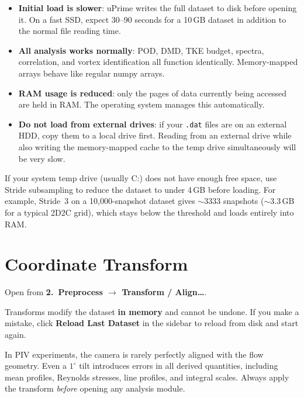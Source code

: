 \documentclass[11pt, a4paper]{report}
\newcommand{\uipth}[1]{\textbf{\textcolor{upblue}{#1}}}
\begin{document}
\begin{itemize}[leftmargin=1.5em]
  \item \textbf{Initial load is slower}: uPrime writes the full dataset to disk before opening it. On a fast SSD, expect 30--90 seconds for a 10\,GB dataset in addition to the normal file reading time.
  \item \textbf{All analysis works normally}: POD, DMD, TKE budget, spectra, correlation, and vortex identification all function identically. Memory-mapped arrays behave like regular numpy arrays.
  \item \textbf{RAM usage is reduced}: only the pages of data currently being accessed are held in RAM. The operating system manages this automatically.
  \item \textbf{Do not load from external drives}: if your \texttt{.dat} files are on an external HDD, copy them to a local drive first. Reading from an external drive while also writing the memory-mapped cache to the temp drive simultaneously will be very slow.
\end{itemize}

\begin{tipbox}
If your system temp drive (usually C:) does not have enough free space, use Stride subsampling to reduce the dataset to under 4\,GB before loading. For example, Stride~3 on a 10,000-snapshot dataset gives $\sim$3333 snapshots ($\sim$3.3\,GB for a typical 2D2C grid), which stays below the threshold and loads entirely into RAM.
\end{tipbox}

\chapter{Coordinate Transform}
\label{ch:transform}

Open from \uipth{2.\ Preprocess $\to$ Transform / Align\ldots}.

\begin{warnbox}
Transforms modify the dataset \textbf{in memory} and cannot be undone. If you make a mistake, click \uipth{Reload Last Dataset} in the sidebar to reload from disk and start again.
\end{warnbox}

In PIV experiments, the camera is rarely perfectly aligned with the flow geometry. Even a $1^\circ$ tilt introduces errors in all derived quantities, including mean profiles, Reynolds stresses, line profiles, and integral scales. Always apply the transform \emph{before} opening any analysis module.
\end{document}
